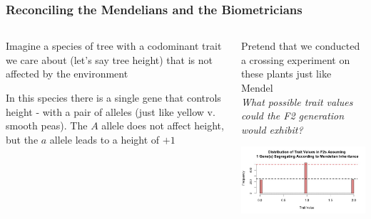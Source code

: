 \documentclass{beamer}
\begin{document}
\begin{frame}
\frametitle{Reconciling the Mendelians and the Biometricians}

\begin{columns}
	\begin{column}{0.4\textwidth}
\small	Imagine a species of tree with a codominant trait we care about (let's say tree height) that is not affected by the environment\\\pause

\bigskip

\small In this species there is a single gene that controls height - with a pair of alleles (just like yellow v. smooth peas). The $A$ allele does not affect height, but the $a$ allele leads to a height of $+1$ \\ \pause

\bigskip



\end{column}
\begin{column}{0.6\textwidth}
Pretend that we conducted a crossing experiment on these plants just like Mendel\\
 \textit{What possible trait values could the F2 generation would exhibit?} \\
\pause
\bigskip

\includegraphics[keepaspectratio, width = \textwidth]{img/oneGene} \\  
\end{column}
\end{columns}	



\end{frame}
\end{document}
